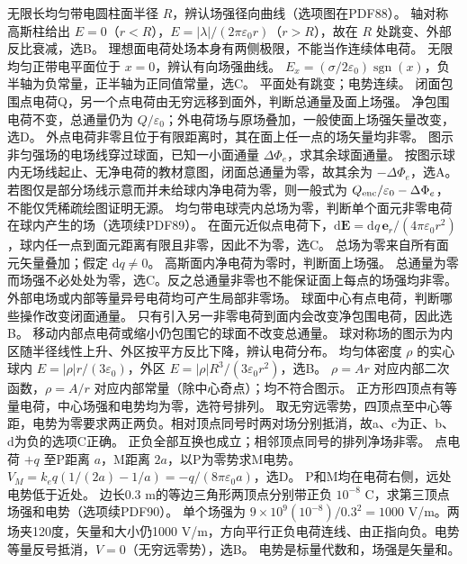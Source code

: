 \problemtext 无限长均匀带电圆柱面半径 $R$，辨认场强径向曲线（选项图在PDF88）。
\workings 轴对称高斯柱给出 $E=0$（$r<R$），$E=|\lambda|/(2\pi\varepsilon_0r)$（$r>R$），故在 $R$ 处跳变、外部反比衰减，选B。
\crosscheck 理想面电荷处场本身有两侧极限，不能当作连续体电荷。
\problemtext 无限均匀正带电平面位于 $x=0$，辨认有向场强曲线。
\workings $E_x=(\sigma/2\varepsilon_0)\operatorname{sgn}(x)$，负半轴为负常量，正半轴为正同值常量，选C。
\crosscheck 平面处有跳变；电势连续。
\problemtext 闭面包围点电荷Q，另一个点电荷由无穷远移到面外，判断总通量及面上场强。
\workings 净包围电荷不变，总通量仍为 $Q/\varepsilon_0$；外电荷场与原场叠加，一般使面上场强矢量改变，选D。
\crosscheck 外点电荷非零且位于有限距离时，其在面上任一点的场矢量均非零。
\problemtext 图示非匀强场的电场线穿过球面，已知一小面通量 $\Delta\Phi_e$，求其余球面通量。
\workings 按图示球内无场线起止、无净电荷的教材意图，闭面总通量为零，故其余为 $-\Delta\Phi_e$，选A。
\crosscheck 若图仅是部分场线示意而并未给球内净电荷为零，则一般式为 $Q_{\rm enc}/\varepsilon_0-\Delta\Phi_e$，不能仅凭稀疏绘图证明无源。
\problemtext 均匀带电球壳内总场为零，判断单个面元非零电荷在球内产生的场（选项续PDF89）。
\workings 在面元近似点电荷下，$\mathrm d\bm E=\mathrm dq\,\bm e_r/(4\pi\varepsilon_0r^2)$，球内任一点到面元距离有限且非零，因此不为零，选C。
\crosscheck 总场为零来自所有面元矢量叠加；假定 $\mathrm dq\ne0$。
\problemtext 高斯面内净电荷为零时，判断面上场强。
\workings 总通量为零而场强不必处处为零，选C。反之总通量非零也不能保证面上每点的场强均非零。
\crosscheck 外部电场或内部等量异号电荷均可产生局部非零场。
\problemtext 球面中心有点电荷，判断哪些操作改变闭面通量。
\workings 只有引入另一非零电荷到面内会改变净包围电荷，因此选B。
\crosscheck 移动内部点电荷或缩小仍包围它的球面不改变总通量。
\problemtext 球对称场的图示为内区随半径线性上升、外区按平方反比下降，辨认电荷分布。
\workings 均匀体密度 $\rho$ 的实心球内 $E=|\rho|r/(3\varepsilon_0)$，外区 $E=|\rho|R^3/(3\varepsilon_0r^2)$，选B。
\crosscheck $\rho=Ar$ 对应内部二次函数，$\rho=A/r$ 对应内部常量（除中心奇点）；均不符合图示。
\problemtext 正方形四顶点有等量电荷，中心场强和电势均为零，选符号排列。
\workings 取无穷远零势，四顶点至中心等距，电势为零要求两正两负。相对顶点同号时两对场分别抵消，故a、c为正、b、d为负的选项C正确。
\crosscheck 正负全部互换也成立；相邻顶点同号的排列净场非零。
\problemtext 点电荷 $+q$ 至P距离 $a$，M距离 $2a$，以P为零势求M电势。
\workings $V_M=k_eq(1/(2a)-1/a)=-q/(8\pi\varepsilon_0a)$，选D。
\crosscheck P和M均在电荷右侧，远处电势低于近处。
\problemtext 边长0.3 m的等边三角形两顶点分别带正负 $10^{-8}$ C，求第三顶点场强和电势（选项续PDF90）。
\workings 单个场强为 $9\times10^9(10^{-8})/0.3^2=1000$ V/m。两场夹120度，矢量和大小仍1000 V/m，方向平行正负电荷连线、由正指向负。电势等量反号抵消，$V=0$（无穷远零势），选B。
\crosscheck 电势是标量代数和，场强是矢量和。

